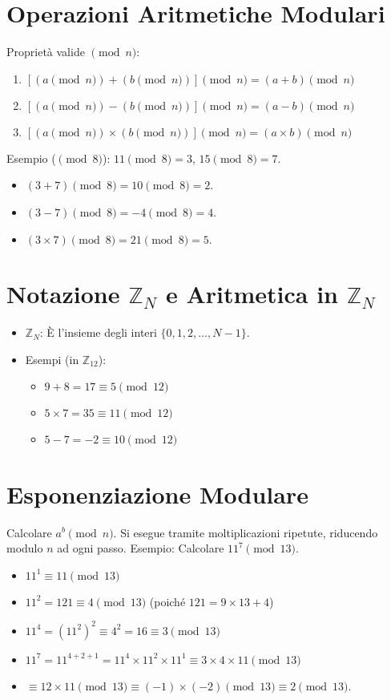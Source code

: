\section{Operazioni Aritmetiche Modulari}
Proprietà valide $\pmod n$:
\begin{enumerate}
    \item $[(a \pmod n) + (b \pmod n)] \pmod n = (a + b) \pmod n$
    \item $[(a \pmod n) - (b \pmod n)] \pmod n = (a - b) \pmod n$
    \item $[(a \pmod n) \times (b \pmod n)] \pmod n = (a \times b) \pmod n$
\end{enumerate}
Esempio ($\pmod 8$): $11 \pmod 8 = 3$, $15 \pmod 8 = 7$.
\begin{itemize}
    \item $(3+7) \pmod 8 = 10 \pmod 8 = 2$.
    \item $(3-7) \pmod 8 = -4 \pmod 8 = 4$.
    \item $(3 \times 7) \pmod 8 = 21 \pmod 8 = 5$.
\end{itemize}

\section{Notazione $\mathbb{Z}_N$ e Aritmetica in $\mathbb{Z}_N$}
\begin{itemize}
    \item $\mathbb{Z}_N$: È l'insieme degli interi $\{0, 1, 2, \dots, N-1\}$.
    \item Esempi (in $\mathbb{Z}_{12}$):
    \begin{itemize}
        \item $9 + 8 = 17 \equiv 5 \pmod{12}$
        \item $5 \times 7 = 35 \equiv 11 \pmod{12}$
        \item $5 - 7 = -2 \equiv 10 \pmod{12}$
    \end{itemize}
\end{itemize}

\section{Esponenziazione Modulare}
Calcolare $a^b \pmod n$. Si esegue tramite moltiplicazioni ripetute, riducendo modulo $n$ ad ogni passo.
Esempio: Calcolare $11^7 \pmod{13}$.
\begin{itemize}
    \item $11^1 \equiv 11 \pmod{13}$
    \item $11^2 = 121 \equiv 4 \pmod{13}$ (poiché $121 = 9 \times 13 + 4$)
    \item $11^4 = (11^2)^2 \equiv 4^2 = 16 \equiv 3 \pmod{13}$
    \item $11^7 = 11^{4+2+1} = 11^4 \times 11^2 \times 11^1 \equiv 3 \times 4 \times 11 \pmod{13}$
    \item $\equiv 12 \times 11 \pmod{13} \equiv (-1) \times (-2) \pmod{13} \equiv 2 \pmod{13}$.
\end{itemize}


